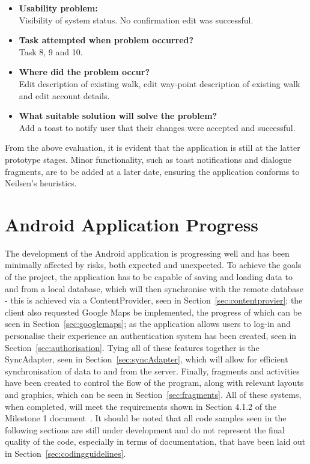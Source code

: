 \documentclass[11pt,a4paper]{article}
\begin{document}
\begin{itemize}
	\item\textbf{Usability problem:}\\
	Visibility of system status. No confirmation edit was successful.

	\item\textbf{Task attempted when problem occurred?}\\
	Task 8, 9 and 10.

	\item\textbf{Where did the problem occur?}\\
	Edit description of existing walk, edit way-point description of existing walk and edit account details.

	\item\textbf{What suitable solution will solve the problem?}\\
	Add a toast to notify user that their changes were accepted and successful.

\end{itemize}

From the above evaluation, it is evident that the application is still at the latter prototype stages. Minor functionality, such as toast notifications and dialogue fragments, are to be added at a later date, ensuring the application conforms to Neilsen's heuristics.



\section{Android Application Progress}
The development of the Android application is progressing well and has been minimally affected by risks, both expected and unexpected. To achieve the goals of the project, the application has to be capable of saving and loading data to and from a local database, which will then synchronise with the remote database - this is achieved via a ContentProvider, seen in Section~\ref{sec:contentprovier}; the client also requested Google Maps be implemented, the progress of which can be seen in Section~\ref{sec:googlemaps}; as the application allows users to log-in and personalise their experience an authentication system has been created, seen in Section~\ref{sec:authorisation}. Tying all of these features together is the SyncAdapter, seen in Section~\ref{sec:syncAdapter}, which will allow for efficient synchronisation of data to and from the server. Finally, fragments and activities have been created to control the flow of the program, along with relevant layouts and graphics, which can be seen in Section~\ref{sec:fragments}. All of these systems, when completed, will meet the requirements shown in Section 4.1.2 of the Milestone 1 document~\cite{initialDoc}. It should be noted that all code samples seen in the following sections are still under development and do not represent the final quality of the code, especially in terms of documentation, that have been laid out in Section~\ref{sec:codingguidelines}.
\end{document}
